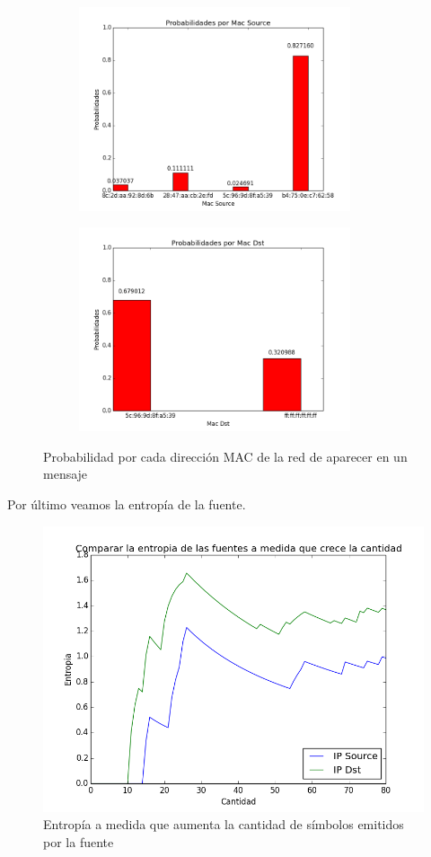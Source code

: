 \begin{figure}[H]
\begin{subfigure}{0.6\textwidth}
\includegraphics[width=0.9\linewidth, height=6cm]{imagenes/exp1/11probabilidadMacSource} 
\caption{}
\end{subfigure}
\begin{subfigure}{0.6\textwidth}
\includegraphics[width=0.9\linewidth, height=6cm]{imagenes/exp1/12probabilidadMacDst}
\caption{}
\end{subfigure}
\caption{Probabilidad por cada direcci\'on MAC de la red de aparecer en un mensaje}
\label{fig:1}
\end{figure}

\newpage

Por \'ultimo veamos la entrop\'ia de la fuente.

\begin{figure}[h!]
\centering
\includegraphics[width=0.7\linewidth]{imagenes/exp1/8entropiaIPDstyIPSource}
\caption{Entrop\'ia a medida que aumenta la cantidad de s\'imbolos emitidos por la fuente}
\label{exp1grafico1}
\end{figure}

